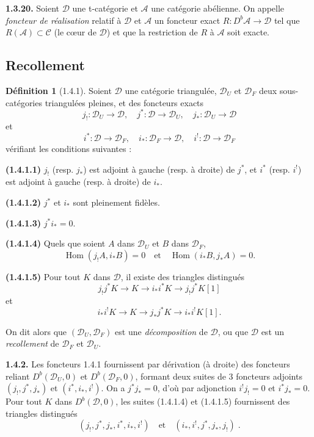 \documentclass[12pt,a4paper]{article}
\theoremstyle{plain}
\theoremstyle{definition}
\newtheorem{definition}[theorem]{Définition}
\theoremstyle{remark}
\DeclareMathOperator{\Hom}{Hom}
\newcommand{\cA}{\mathcal{A}}
\newcommand{\cC}{\mathcal{C}}
\newcommand{\cD}{\mathcal{D}}
\begin{document}
\smallskip

\noindent
\textbf{1.3.20.} Soient $\cD$ une t-catégorie et $\cA$ une catégorie abélienne. On appelle \emph{foncteur de réalisation} relatif à $\cD$ et $\cA$ un foncteur exact $R : D^{b}\cA \to \cD$ tel que $R(\cA) \subset \cC$ (le cœur de $\cD$) et que la restriction de $R$ à $\cA$ soit exacte.

\subsection{Recollement}

\begin{definition}[1.4.1]
Soient $\cD$ une catégorie triangulée, $\cD_{U}$ et $\cD_{F}$ deux sous-catégories triangulées pleines, et des foncteurs exacts
\[
j_{!} : \cD_{U} \to \cD, \quad j^{*} : \cD \to \cD_{U}, \quad j_{*} : \cD_{U} \to \cD
\]
et
\[
i^{*} : \cD \to \cD_{F}, \quad i_{*} : \cD_{F} \to \cD, \quad i^{!} : \cD \to \cD_{F}
\]
vérifiant les conditions suivantes :

\smallskip

\noindent
\textbf{(1.4.1.1)} $j_{!}$ (resp. $j_{*}$) est adjoint à gauche (resp. à droite) de $j^{*}$, et $i^{*}$ (resp. $i^{!}$) est adjoint à gauche (resp. à droite) de $i_{*}$.

\noindent
\textbf{(1.4.1.2)} $j^{*}$ et $i_{*}$ sont pleinement fidèles.

\noindent
\textbf{(1.4.1.3)} $j^{*}i_{*} = 0$.

\noindent
\textbf{(1.4.1.4)} Quels que soient $A$ dans $\cD_{U}$ et $B$ dans $\cD_{F}$,
\[
\Hom(j_{!}A, i_{*}B) = 0 \quad \text{et} \quad \Hom(i_{*}B, j_{*}A) = 0.
\]

\noindent
\textbf{(1.4.1.5)} Pour tout $K$ dans $\cD$, il existe des triangles distingués
\[
j_{!}j^{*}K \to K \to i_{*}i^{*}K \to j_{!}j^{*}K[1]
\]
et
\[
i_{*}i^{!}K \to K \to j_{*}j^{*}K \to i_{*}i^{!}K[1].
\]
\end{definition}

On dit alors que $(\cD_{U}, \cD_{F})$ est une \emph{décomposition} de $\cD$, ou que $\cD$ est un \emph{recollement} de $\cD_{F}$ et $\cD_{U}$.

\smallskip

\noindent
\textbf{1.4.2.} Les foncteurs 1.4.1 fournissent par dérivation (à droite) des foncteurs reliant $D^{b}(\cD_{U}, 0)$ et $D^{b}(\cD_{F}, 0)$, formant deux suites de $3$ foncteurs adjoints $(j_{!}, j^{*}, j_{*})$ et $(i^{*}, i_{*}, i^{!})$. On a $j^{*}j_{*} = 0$, d'où par adjonction $i^{!}j_{!} = 0$ et $i^{*}j_{*} = 0$. Pour tout $K$ dans $D^{b}(\cD, 0)$, les suites (1.4.1.4) et (1.4.1.5) fournissent des triangles distingués
\[
(j_{!}, j^{*}, j_{*}, i^{*}, i_{*}, i^{!}) \quad \text{et} \quad (i_{*}, i^{!}, j^{*}, j_{*}, j_{!})\;.
\]
\end{document}
